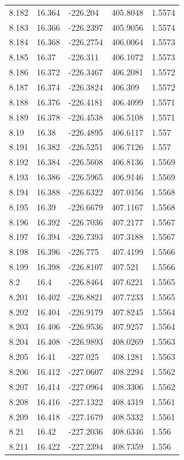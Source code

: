 \begin{tabular}{lllll}
8.182 & 16.364 & -226.204 & 405.8048 & 1.5574 \\
8.183 & 16.366 & -226.2397 & 405.9056 & 1.5574 \\
8.184 & 16.368 & -226.2754 & 406.0064 & 1.5573 \\
8.185 & 16.37 & -226.311 & 406.1072 & 1.5573 \\
8.186 & 16.372 & -226.3467 & 406.2081 & 1.5572 \\
8.187 & 16.374 & -226.3824 & 406.309 & 1.5572 \\
8.188 & 16.376 & -226.4181 & 406.4099 & 1.5571 \\
8.189 & 16.378 & -226.4538 & 406.5108 & 1.5571 \\
8.19 & 16.38 & -226.4895 & 406.6117 & 1.557 \\
8.191 & 16.382 & -226.5251 & 406.7126 & 1.557 \\
8.192 & 16.384 & -226.5608 & 406.8136 & 1.5569 \\
8.193 & 16.386 & -226.5965 & 406.9146 & 1.5569 \\
8.194 & 16.388 & -226.6322 & 407.0156 & 1.5568 \\
8.195 & 16.39 & -226.6679 & 407.1167 & 1.5568 \\
8.196 & 16.392 & -226.7036 & 407.2177 & 1.5567 \\
8.197 & 16.394 & -226.7393 & 407.3188 & 1.5567 \\
8.198 & 16.396 & -226.775 & 407.4199 & 1.5566 \\
8.199 & 16.398 & -226.8107 & 407.521 & 1.5566 \\
8.2 & 16.4 & -226.8464 & 407.6221 & 1.5565 \\
8.201 & 16.402 & -226.8821 & 407.7233 & 1.5565 \\
8.202 & 16.404 & -226.9179 & 407.8245 & 1.5564 \\
8.203 & 16.406 & -226.9536 & 407.9257 & 1.5564 \\
8.204 & 16.408 & -226.9893 & 408.0269 & 1.5563 \\
8.205 & 16.41 & -227.025 & 408.1281 & 1.5563 \\
8.206 & 16.412 & -227.0607 & 408.2294 & 1.5562 \\
8.207 & 16.414 & -227.0964 & 408.3306 & 1.5562 \\
8.208 & 16.416 & -227.1322 & 408.4319 & 1.5561 \\
8.209 & 16.418 & -227.1679 & 408.5332 & 1.5561 \\
8.21 & 16.42 & -227.2036 & 408.6346 & 1.556 \\
8.211 & 16.422 & -227.2394 & 408.7359 & 1.556 \\

\end{tabular}
